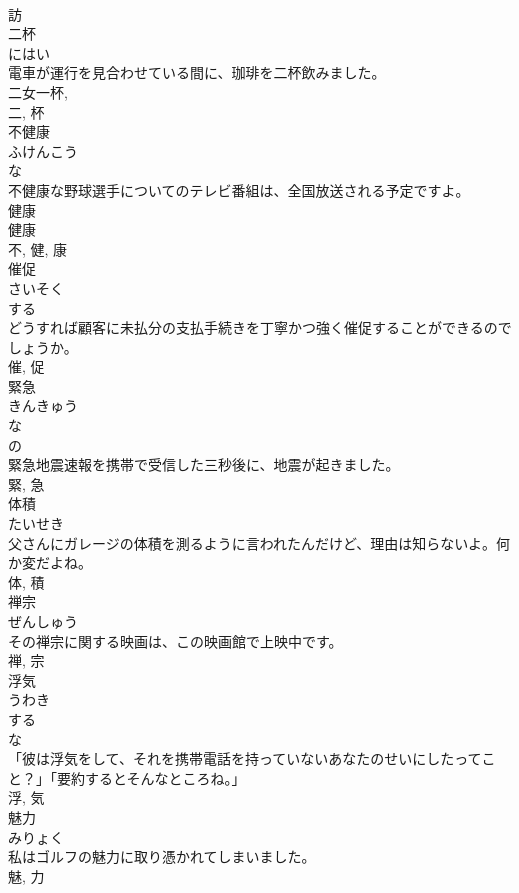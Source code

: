 \documentclass[8pt]{extreport}
\begin{document}
\begin{CJK}{UTF8}{min}
\\	訪	
\\	二杯	
\\	にはい	
\\	電車が運行を見合わせている間に、珈琲を二杯飲みました。	
\\	二女一杯, 
\\	二, 杯	
\\	不健康	
\\	ふけんこう	
\\	な 
\\	不健康な野球選手についてのテレビ番組は、全国放送される予定ですよ。	
\\	健康 
\\	健康 
\\	不, 健, 康	
\\	催促	
\\	さいそく	
\\	する 
\\	どうすれば顧客に未払分の支払手続きを丁寧かつ強く催促することができるのでしょうか。	
\\	催, 促	
\\	緊急	
\\	きんきゅう	
\\	な 
\\	の 
\\	緊急地震速報を携帯で受信した三秒後に、地震が起きました。	
\\	緊, 急	
\\	体積	
\\	たいせき	
\\	父さんにガレージの体積を測るように言われたんだけど、理由は知らないよ。何か変だよね。	
\\	体, 積	
\\	禅宗	
\\	ぜんしゅう	
\\	その禅宗に関する映画は、この映画館で上映中です。	
\\	禅, 宗	
\\	浮気	
\\	うわき	
\\	する 
\\	な 
\\	「彼は浮気をして、それを携帯電話を持っていないあなたのせいにしたってこと？」「要約するとそんなところね。」	
\\	浮, 気	
\\	魅力	
\\	みりょく	
\\	私はゴルフの魅力に取り憑かれてしまいました。	
\\	魅, 力	

\end{CJK}
\end{document}
